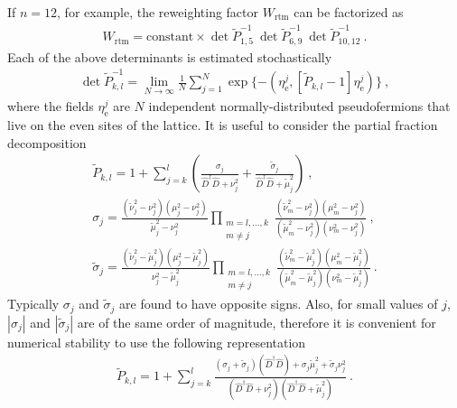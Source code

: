 \documentclass[11pt,fleqn]{article}
\begin{document}
If $n = 12$, for example, the reweighting factor $W_\text{rtm}$ can be factorized as
\begin{gather}
   W_\text{rtm} = \text{constant} \times \det \tilde{P}_{1,5}^{-1} \ \det \tilde{P}_{6,9}^{-1} \ \det \tilde{P}_{10,12}^{-1} \ .
\end{gather}
Each of the above determinants is estimated stochastically
\begin{gather}
   \det \tilde{P}_{k,l}^{-1} = \lim_{N \to \infty} \frac{1}{N} \sum_{j=1}^N \exp \{ - ( \eta^j_\text{e} , [ \tilde{P}_{k,l} - 1 ] \eta^j_\text{e} ) \}
   \ ,
\end{gather}
where the fields $\eta^j_\text{e}$ are $N$ independent normally-distributed pseudofermions that live on the even sites of the lattice. It is useful to consider the partial fraction decomposition
\begin{gather}
   \tilde{P}_{k,l}
   =
   1 + \sum_{j=k}^l \left( \frac{\sigma_j}{\hat{D}^\dag \hat{D} + \nu_j^2} + \frac{\tilde{\sigma}_j}{\hat{D}^\dag \hat{D} + \tilde{\mu}_j^2} \right)
   \ , \\
   \sigma_j =
   \frac{(\tilde{\nu}_j^2-\nu_j^2)(\mu_j^2-\nu_j^2)}{\tilde{\mu}_j^2-\nu_j^2}
   \prod_{\substack{m=l,\dots,k\\m \neq j}} \frac{(\tilde{\nu}_m^2-\nu_j^2)(\mu_m^2-\nu_j^2)}{(\tilde{\mu}_m^2-\nu_j^2)(\nu_m^2-\nu_j^2)}
   \ , \\
   \tilde{\sigma}_j =
   \frac{(\tilde{\nu}_j^2-\tilde{\mu}_j^2)(\mu_j^2-\tilde{\mu}_j^2)}{\nu_j^2-\tilde{\mu}_j^2}
   \prod_{\substack{m=l,\dots,k\\m \neq j}} \frac{(\tilde{\nu}_m^2-\tilde{\mu}_j^2)(\mu_m^2-\tilde{\mu}_j^2)}{(\tilde{\mu}_m^2-\tilde{\mu}_j^2)(\nu_m^2-\tilde{\mu}_j^2)}
   \ .
\end{gather}
Typically $\sigma_j$ and $\tilde{\sigma}_j$ are found to have opposite signs. Also, for small values of $j$, $|\sigma_j|$ and $|\tilde{\sigma}_j|$ are of the same order of magnitude, therefore it is convenient for numerical stability to use the following representation
\begin{gather}
   \tilde{P}_{k,l}
   =
   1 + \sum_{j=k}^l \frac{(\sigma_j+\tilde{\sigma}_j) (\hat{D}^\dag \hat{D}) + \sigma_j \tilde{\mu}_j^2+\tilde{\sigma}_j \nu_j^2}{(\hat{D}^\dag \hat{D} + \nu_j^2)(\hat{D}^\dag \hat{D} + \tilde{\mu}_j^2)}
   \ .
\end{gather}
\end{document}
